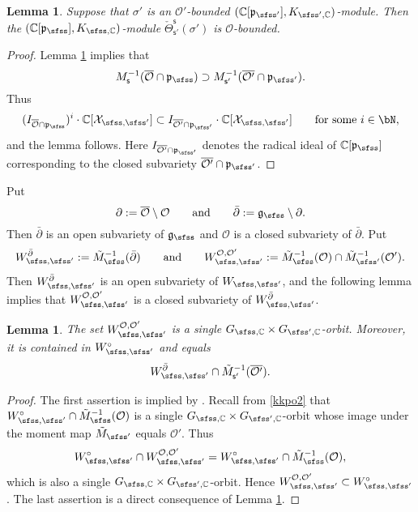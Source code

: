 \documentclass[12pt,a4paper]{amsart}
\newcommand{\CO}{{\mathcal {O}}}
\newcommand{\CX}{{\mathcal {X}}}
\newcommand{\g}{\mathfrak g}
\newcommand{\p}{\mathfrak p}
\numberwithin{equation}{section}
\newtheorem{lem}[thm]{Lemma}
\theoremstyle{remark}
\begin{document}
\begin{lem}\label{comobound}
Suppose that $\sigma'$ is an $\CO'$-bounded $(\C[\p_{\sfss'}], K_{\sfss', \C})$-module.  Then the  $(\C[\p_{\sfss}], K_{\sfss, \C})$-module   $\check \Theta_{\mathsf s'}^{\mathsf s}(\sigma')$ is $\CO$-bounded.
\end{lem}
\begin{proof}
Lemma \ref{liftop0} implies that
\[
   M_{\mathsf s}^{-1}(\overline{\CO}\cap \p_\sfss)\supset M_{\mathsf s'}^{-1}(\overline{\CO'}\cap \p_{\sfss'}).
\]
Thus
\[
 ( I_{\overline{\CO}\cap \p_\sfss})^i\cdot \C[\CX_{\sfss, \sfss'}] \subset I_{\overline{\CO'}\cap \p_{\sfss'}}\cdot  \C[\CX_{\sfss, \sfss'}]\qquad \textrm{for some } i\in \bN,
\]
and the lemma follows. Here $I_{\overline{\CO'}\cap \p_{\sfss'}}$ denotes  the radical ideal of $\C[\p_\sfss]$ corresponding to the closed subvariety $\overline{\CO'}\cap \p_{\sfss'}$.
\end{proof}


Put
\[
\partial :=\overline \CO\setminus \CO\qquad\textrm{and}\qquad  \bar \partial :=\g_\sfss\setminus \partial.
\]
Then $\bar \partial$ is an open subvariety of $\g_\sfss$ and $\CO$ is a closed subvariety of $\bar \partial$.
Put
\[
W_{\sfss, \sfss'}^{\bar \partial}:=\tilde M_{\sfss}^{-1}(\bar \partial )
\qquad\textrm{and}\qquad
  W_{\sfss, \sfss'}^{\CO, \CO'}:=\tilde M_{\sfss}^{-1}(\CO)\cap  \tilde M_{\sfss'}^{-1}(\CO').
\]
Then $W_{\sfss, \sfss'}^{\bar \partial}$ is an open subvariety of $W_{\sfss, \sfss'}$, and the following lemma implies that $W_{\sfss, \sfss'}^{\CO, \CO'}$ is a closed subvariety of $W_{\sfss, \sfss'}^{\bar \partial}$.

\begin{lem}\label{liftop0}
The set $W_{\sfss, \sfss'}^{\CO, \CO'}$ is  a single $G_{\sfss, \C}\times G_{\sfss',\C}$-orbit. Moreover, it is  contained in $W_{\sfss,\sfss'}^\circ$ and equals
\[
   W_{\sfss, \sfss'}^{\bar \partial} \cap \tilde M_{\mathsf s'}^{-1}(\overline{\CO'}).
\]
\end{lem}
\begin{proof}
The first assertion is implied by \cite[Theorem 3.6]{DKPC}. Recall from \eqref{kkpo2} that $W_{\sfss,\sfss'}^\circ\cap \tilde M_{\sfss}^{-1}(\CO)$ is a single  $G_{\sfss, \C}\times G_{\sfss',\C}$-orbit  whose image under the moment map $\tilde M_{\sfss'}$ equals $\CO'$. Thus
\[
W_{\sfss,\sfss'}^\circ\cap W_{\sfss, \sfss'}^{\CO, \CO'}=W_{\sfss,\sfss'}^\circ\cap \tilde M_{\sfss}^{-1}(\CO),
\]
which  is also a   single  $G_{\sfss, \C}\times G_{\sfss',\C}$-orbit. Hence $W_{\sfss, \sfss'}^{\CO, \CO'}\subset W_{\sfss,\sfss'}^\circ$. The last assertion is a direct consequence of Lemma \ref{liftop0}.

\end{proof}
\end{document}
